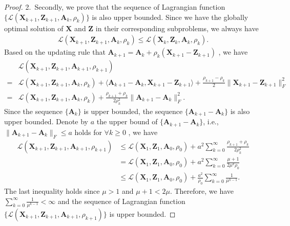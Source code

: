 \documentclass[10pt,onecolumn,letterpaper]{article}
\begin{document}
\begin{proof}
2.\ Secondly, we prove that the sequence of Lagrangian function $\{\mathcal{L}(\bm{X}_{k+1},\bm{Z}_{k+1},\bm{A}_{k},\rho_{k})\}$ is also upper bounded. Since we have the globally optimal solution of $\bm{X}$ and $\bm{Z}$ in their corresponding subproblems, we always have 
\begin{align}
\mathcal{L}(\bm{X}_{k+1},\bm{Z}_{k+1},\bm{A}_{k},\rho_{k})
\le
\mathcal{L}(\bm{X}_{k},\bm{Z}_{k},\bm{A}_{k},\rho_{k}).
\end{align}
Based on the updating rule that 
$
\bm{A}_{k+1}
=
\bm{A}_{k} + \rho_{k}(\bm{X}_{k+1}-\bm{Z}_{k+1})
$
,
we have 
\begin{align}
&
\mathcal{L}(\bm{X}_{k+1},\bm{Z}_{k+1},\bm{A}_{k+1},\rho_{k+1})
\\
=
&
\mathcal{L}(\bm{X}_{k+1},\bm{Z}_{k+1},\bm{A}_{k},\rho_{k})
+
\langle
\bm{A}_{k+1}
-
\bm{A}_{k}
,
\bm{X}_{k+1}
-
\bm{Z}_{k+1}
\rangle
+
\frac{\rho_{k+1}-\rho_{k}}{2}
\|
\bm{X}_{k+1}-\bm{Z}_{k+1}
\|_{F}^{2}
\\
=
&
\mathcal{L}(\bm{X}_{k+1},\bm{Z}_{k+1},\bm{A}_{k},\rho_{k})
+
\frac{\rho_{k+1}+\rho_{k}}{2\rho_{k}^{2}}
\|
\bm{A}_{k+1}
-
\bm{A}_{k}
\|_{F}^{2}.
\end{align}
Since the sequence 
$\{
\bm{A}_{k}\}$
is upper bounded, the sequence 
$\{
\bm{A}_{k+1}
-
\bm{A}_{k}
\}$ is also upper bounded. Denote by $a$ the upper bound of 
$\{
\bm{A}_{k+1}
-
\bm{A}_{k}
\}$, 
i.e., 
$
\|
\bm{A}_{k+1}
-
\bm{A}_{k}
\|_{F}\le a
$
holds for
$\forall k\ge0$
,
we have 
\begin{align}
\mathcal{L}(\bm{X}_{k+1},\bm{Z}_{k+1},\bm{A}_{k+1},\rho_{k+1})
&
\le
\mathcal{L}(\bm{X}_{1},\bm{Z}_{1},\bm{A}_{0},\rho_{0})
+
a^2\sum_{k=0}^{\infty}\frac{\rho_{k+1}+\rho_{k}}{2\rho_{k}^{2}}
\\
&
=
\mathcal{L}(\bm{X}_{1},\bm{Z}_{1},\bm{A}_{0},\rho_{0})
+
a^2\sum_{k=0}^{\infty}\frac{\mu+1}{2\mu^{k}\rho_{0}}
\\
&
\le
\mathcal{L}(\bm{X}_{1},\bm{Z}_{1},\bm{A}_{0},\rho_{0})
+
\frac{a^2}{\rho_{0}}\sum_{k=0}^{\infty}\frac{1}{\mu^{k-1}}.
\end{align}
The last inequality holds since $\mu>1$ and $\mu+1<2\mu$. Therefore, we have $\sum_{k=0}^{\infty}\frac{1}{\mu^{k-1}}<\infty$ and the sequence of Lagrangian function 
$\{\mathcal{L}(\bm{X}_{k+1},\bm{Z}_{k+1},\bm{A}_{k+1},\rho_{k+1})\}$
is upper bounded.


\end{proof}
\end{document}
